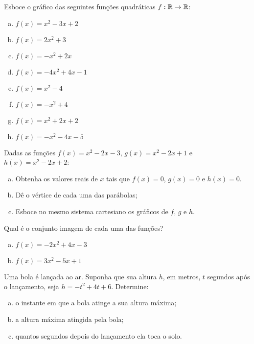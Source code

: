\begin{secExercicios}

\begin{exer}
    Esboce o gráfico das seguintes funções quadráticas $f:\mathbb{R}\to\mathbb{R}$:

    \begin{enumerate}[a)]
        \item $f(x)=x^2-3x+2$
        \item $f(x)=2x^2+3$
        \item $f(x)=-x^2+2x$
        \item $f(x)=-4x^2+4x-1$
        \item $f(x)=x^2-4$
        \item $f(x)=-x^2+4$
        \item $f(x)=x^2+2x+2$
        \item $f(x)=-x^2-4x-5$
    \end{enumerate}
\end{exer}

\begin{exer}
    Dadas as funções $f(x)=x^2-2x-3$, $g(x)=x^2-2x+1$ e $h(x)=x^2-2x+2$:
    \begin{enumerate}[a)]
        \item Obtenha os valores reais de $x$ tais que $f(x)=0$, $g(x)=0$ e $h(x)=0$.
        \item Dê o vértice de cada uma das parábolas;
        \item Esboce no mesmo sistema cartesiano os gráficos de $f$, $g$ e $h$.
    \end{enumerate}
\end{exer}

\begin{exer}
    Qual é o conjunto imagem de cada uma das funções?
    \begin{enumerate}[a)]
        \item $f(x)=-2x^2+4x-3$
        \item $f(x)=3x^2-5x+1$
    \end{enumerate}
\end{exer}

\begin{exer}
    Uma bola é lançada ao ar. Suponha que sua altura $h$, em metros, $t$ segundos após o lançamento, seja $h=-t^2+4t+6$. Determine:
    \begin{enumerate}[a)]
        \item o instante em que a bola atinge a sua altura máxima;
        \item a altura máxima atingida pela bola;
        \item quantos segundos depois do lançamento ela toca o solo.
    \end{enumerate}
\end{exer}


\end{secExercicios}
